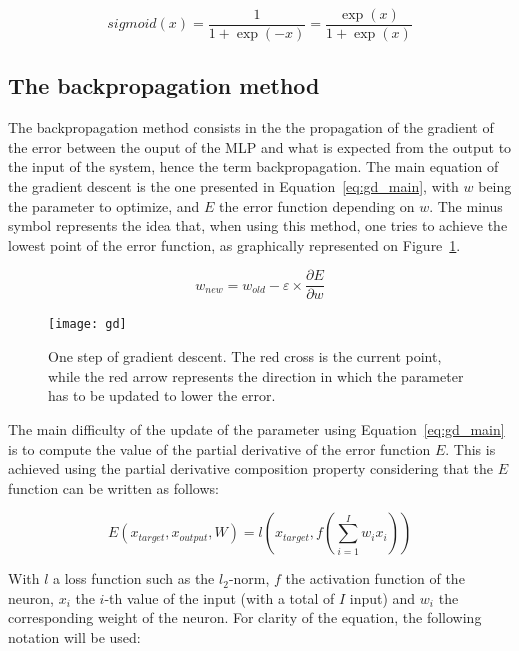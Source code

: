     \begin{equation}
        sigmoid(x) = \frac{1}{1 + \exp(-x)} = \frac{\exp(x)}{1 + \exp(x)}
        \label{eq:sigmoid}
    \end{equation}

    \subsection{The backpropagation method}
    The backpropagation method consists in the the propagation of the gradient of the error between the ouput of the MLP and what is expected from the output to the input of the system, hence the term backpropagation. The main equation of the gradient descent is the one presented in Equation~\ref{eq:gd_main}, with $w$ being the parameter to optimize, and $E$ the error function depending on $w$. The minus symbol represents the idea that, when using this method, one tries to achieve the lowest point of the error function, as graphically represented on Figure~\ref{fig:gd}. 

\begin{equation}
    w_{new} = w_{old} - \varepsilon \times \frac{\partial E}{\partial w}
    \label{eq:gd_main}
\end{equation}

    \begin{figure}[h]
        \centering
        \texttt{[image: gd]}
        \caption{One step of gradient descent. The red cross is the current point, while the red arrow represents the direction in which the parameter has to be updated to lower the error.}
\label{fig:gd}
    \end{figure}

    The main difficulty of the update of the parameter using Equation~\ref{eq:gd_main} is to compute the value of the partial derivative of the error function $E$. This is achieved using the partial derivative composition property considering that the $E$ function can be written as follows:

    \begin{equation}
        E\left(x_{target}, x_{output}, W\right) = l\left(x_{target}, f\left(\sum_{i=1}^I w_i x_i\right)\right)
        \label{eq:error_function}
    \end{equation}

    With $l$ a loss function such as the $l_2$-norm, $f$ the activation function of the neuron, $x_i$ the $i$-th value of the input (with a total of $I$ input) and $w_i$ the corresponding weight of the neuron. For clarity of the equation, the following notation will be used:

